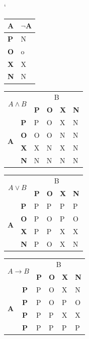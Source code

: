 \documentclass[11pt,a4paper]{article}
\begin{document}
\begin{table}[h]
	\catcode`
	\begin{center}
		\begin{tabular}{|l|l|}
			\hline		
			A & $\neg$A \\
		 	\hline
	 		\textbf{P} & N \\
	 		\hline
	 		\textbf{O} & o \\
			\hline
		 	\textbf{X} & X \\
		 	\hline
		 	\textbf{N} & N \\
	 		\hline
		\end{tabular}
		\begin{tabular}{|l|l|l|l|l|l|}
			\hline			
			\multicolumn{2}{|c|}{\multirow{2}{*}{$A \wedge B$}} & \multicolumn{4}{c|}{B} \\
			\cline{3-6}
		 	 \multicolumn{2}{|c|}{} & \textbf{P} & \textbf{O} & \textbf{X} & \textbf{N} \\  	
			\hline		 
			\multirow{4}{*}{\textbf{A}} & \textbf {P} & P & O & X & N  \\
			\cline{2-6}		 
		 	& \textbf{O} & O & O & N & N \\ 
			\cline{2-6}		
		 	& \textbf{X} & X & N & X & N \\
			\cline{2-6}
		 	& \textbf{N} & N & N & N & N \\
			\hline		
		\end{tabular}
		\begin{tabular}{|l|l|l|l|l|l|}
			\hline			
			\multicolumn{2}{|c|}{\multirow{2}{*}{$A \vee B$}} & \multicolumn{4}{c|}{B} \\
			\cline{3-6}
			\multicolumn{2}{|c|}{}& \textbf{P} & \textbf{O} & \textbf{X} & \textbf{N} \\  	
			\hline		 
			\multirow{4}{*}{\textbf{A}} & \textbf {P} & P & P & P & P  \\
			\cline{2-6}		 
		 	& \textbf{O} & P & O & P & O \\ 
			\cline{2-6}		
			& \textbf{X} & P & P & X & X \\
			\cline{2-6}
			& \textbf{N} & P & O & X & N \\
			\hline		
		\end{tabular}
		\begin{tabular}{|l|l|l|l|l|l|}
			\hline			
			\multicolumn{2}{|c|}{\multirow{2}{*}{$A\rightarrow B$}} & \multicolumn{4}{c|}{B} \\
		\cline{3-6}
		 \multicolumn{2}{|c|}{}& \textbf{P} & \textbf{O} & \textbf{X} & \textbf{N} \\  	
		\hline		 
		\multirow{4}{*}{\textbf{A}} & \textbf {P} & P & O & X & N  \\
		\cline{2-6}		 
		 & \textbf{P} & P & O & P & O \\
		\cline{2-6}		
		 & \textbf{P} & P & P & X & X \\
		\cline{2-6}
		 & \textbf{P} & P & P & P & P \\
		\hline		
		\end{tabular}		
		

\end{center}
\end{table}
\end{document}
